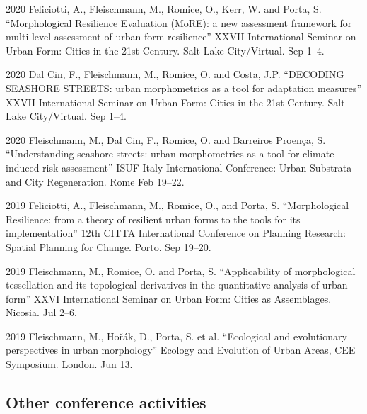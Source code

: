 \documentclass[12pt,a4paper]{report}
\begin{document}
\begin{tablist}
        \item[2020] \tab{}Feliciotti, A., Fleischmann, M., Romice, O., Kerr, W. and Porta, S. \enquote{Morphological Resilience Evaluation (MoRE): a new assessment framework for multi-level assessment of urban form resilience} XXVII International Seminar on Urban Form: Cities in the 21st Century. Salt Lake City/Virtual. \@ Sep 1--4.

        \item[2020] \tab{}Dal Cin, F., Fleischmann, M., Romice, O. and Costa, J.P. \enquote{DECODING SEASHORE STREETS: urban morphometrics as a tool for adaptation measures} XXVII International Seminar on Urban Form: Cities in the 21st Century. Salt Lake City/Virtual. \@ Sep 1--4.

        \item[2020] \tab{}Fleischmann, M., Dal Cin, F., Romice, O. and Barreiros Proença, S. \enquote{Understanding seashore streets: urban morphometrics as a tool for climate-induced risk assessment} ISUF Italy International Conference: Urban Substrata and City Regeneration. Rome \@ Feb 19--22.

        \item[2019] \tab{}Feliciotti, A., Fleischmann, M., Romice, O., and Porta, S.  \enquote{Morphological Resilience: from a theory of resilient urban forms to the tools for its implementation} 12th CITTA International Conference on Planning Research: Spatial Planning for Change. Porto. \@ Sep 19--20.

        \item[2019] \tab{}Fleischmann, M., Romice, O. and Porta, S. \enquote{Applicability of morphological tessellation and its topological derivatives in the quantitative analysis of urban form} XXVI International Seminar on Urban Form: Cities as Assemblages. Nicosia. \@ Jul 2--6.

        \item[2019] \tab{}Fleischmann, M., Hořák, D., Porta, S. et al. \enquote{Ecological and evolutionary perspectives in urban morphology} Ecology and Evolution of Urban Areas, CEE Symposium. London. \@ Jun 13.


    \end{tablist}

    \subsection*{Other conference activities}
\end{document}
